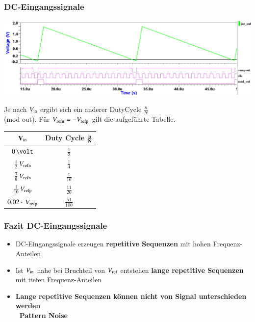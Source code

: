 \subsubsection{DC-Eingangssignale}

\begin{minipage}[c]{0.6\columnwidth}
    \includegraphics[width=\columnwidth]{images/sigma_delta_timing.png}

    Je nach $V_{\rm in}$ ergibt sich ein anderer DutyCycle $\frac{n}{N}$\\
    (mod out). Für $V_{\rm refn} = - V_{\rm refp}$ gilt die aufgeführte Tabelle. 
\end{minipage}
\hfill
\begin{minipage}[c]{0.38\columnwidth}
    \renewcommand{\arraystretch}{1.3}
    \begin{tabular}{c | c}
        $\bf{V_{\rm in}}$               & \textbf{Duty Cycle} $\bf{\frac{n}{N}}$ \\
        \midrule
        $0 \, \volt$                    & $\frac{1}{2}$ \\
        $\frac{1}{2} \, V_{\rm refn}$   & $\frac{1}{4}$ \\
        $\frac{7}{8} \, V_{\rm refn}$   & $\frac{1}{16}$ \\
        $\frac{1}{10} \, V_{\rm refp}$  & $\frac{11}{20}$ \\
        $0.02 \cdot \, V_{\rm refp}$    & $\frac{51}{100}$
    \end{tabular}
    \renewcommand{\arraystretch}{1}
\end{minipage}


\subsubsection*{Fazit DC-Eingangssignale}

\begin{itemize}
    \item DC-Eingangssignale erzeugen \textbf{repetitive Sequenzen} mit hohen Frequenz-Anteilen
    \item Ist $V_{\rm in}$ nahe bei Bruchteil von $V_{\rm ref}$ entstehen \textbf{lange repetitive Sequenzen} mit tiefen Frequenz-Anteilen
    \item \textbf{Lange repetitive Sequenzen können nicht von Signal unterschieden werden\\
        \textrightarrow\ Pattern Noise}
\end{itemize}
        

